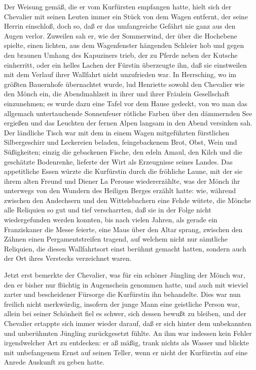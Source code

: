 Der Weisung gemäß, die er vom Kurfürsten empfangen hatte, hielt
sich der Chevalier mit seinen Leuten immer ein Stück von dem Wagen
entfernt, der seine Herrin einschloß, doch so, daß er das
umfangreiche Gefährt nie ganz aus den Augen verlor. Zuweilen sah
er, wie der Sommerwind, der über die Hochebene spielte, einen
lichten, aus dem Wagenfenster hängenden Schleier hob und gegen den
braunen Umhang des Kapuziners trieb, der zu Pferde neben der
\pagenum{[109]} Kutsche einherritt, oder ein helles Lachen der
Fürstin überzeugte ihn, daß sie einstweilen mit dem Verlauf ihrer
Wallfahrt nicht unzufrieden war. In Herrsching, wo im größten
Bauernhofe übernachtet wurde, lud Henriette sowohl den Chevalier
wie den Mönch ein, die Abendmahlzeit in ihrer und ihrer Fräulein
Gesellschaft einzunehmen; es wurde dazu eine Tafel vor dem Hause
gedeckt, von wo man das allgemach untertauchende Sonnenfeuer
rötliche Farben über den dämmernden See ergießen und das Leuchten
der fernen Alpen langsam in den Abend versinken sah. Der ländliche
Tisch war mit dem in einem Wagen mitgeführten fürstlichen
Silbergeschirr und Leckereien beladen, feingebackenem Brot, Obst,
Wein und Süßigkeiten; einzig die gebackenen Fische, den edeln
Amaul, den Kilch und die geschätzte Bodenrenke, lieferte der Wirt
als Erzeugnisse seines Landes. Das appetitliche Essen würzte die
Kurfürstin durch die fröhliche Laune, mit der sie ihrem alten
Freund und Diener La Perouse wiedererzählte, was der Mönch ihr
unterwegs von den Wundern des Heiligen Berges erzählt hatte: wie,
während zwischen den Andechsern und den Wittelsbachern eine Fehde
wütete, die Mönche alle Reliquien so gut und tief verscharrten, daß
sie in der Folge nicht wiedergefunden werden konnten, bis nach
vielen Jahren, als gerade ein Franziskaner die Messe feierte, eine
Maus über den Altar sprang, zwischen den Zähnen einen
Pergamentstreifen tragend, auf welchem nicht nur sämtliche
Reliquien, die diesen Wallfahrtsort einst berühmt gemacht hatten,
sondern auch der Ort ihres Verstecks verzeichnet waren.

Jetzt erst bemerkte der Chevalier, was für ein schöner Jüngling der
Mönch war, den er bisher nur flüchtig in Augenschein genommen
hatte, und auch mit wieviel zarter \pagenum{[110]} und bescheidener
Fürsorge die Kurfürstin ihn behandelte. Dies war nun freilich nicht
merkwürdig, insofern der junge Mann eine geistliche Person war,
allein bei seiner Schönheit fiel es schwer, sich dessen bewußt zu
bleiben, und der Chevalier ertappte sich immer wieder darauf, daß
er sich hinter dem unbekannten und unberühmten Jüngling
zurückgesetzt fühlte. An ihm war indessen kein Fehler irgendwelcher
Art zu entdecken: er aß mäßig, trank nichts als Wasser und blickte
mit unbefangenem Ernst auf seinen Teller, wenn er nicht der
Kurfürstin auf eine Anrede Auskunft zu geben hatte.

